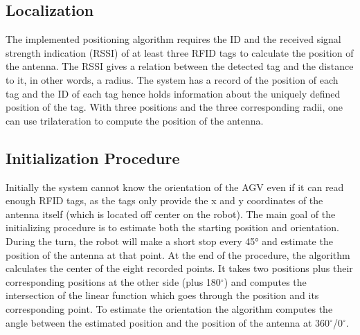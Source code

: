 \subsection*{Localization
}
The implemented positioning algorithm requires the ID and the received signal strength indication (RSSI) of at least three RFID tags to calculate the position of the antenna. The RSSI gives a relation between the detected tag and the distance to it, in other words, a radius. The system has a record of the position of each tag and the ID of each tag hence holds information about the uniquely defined position of the tag. With three positions and the three corresponding radii, one can use trilateration to compute the position of the antenna.  
\subsection*{Initialization Procedure
}
Initially the system cannot  know the orientation of the AGV even if it can read enough RFID tags, as the tags only provide the x and y coordinates of the antenna itself (which is located off center on the robot). The main goal of the initializing procedure is to estimate both the starting position and orientation. During the turn, the robot will make a short stop every 45° and estimate the position of the antenna at that point. At the end of the procedure, the algorithm calculates the center of the eight recorded points. It takes two positions plus their corresponding positions at the other side (plus 180$^{\circ}$) and computes the intersection of the linear function which goes through the position and its corresponding point. To estimate the orientation the algorithm computes the angle between the estimated position and the position of the antenna at 360$^{\circ}$/0$^{\circ}$. 
